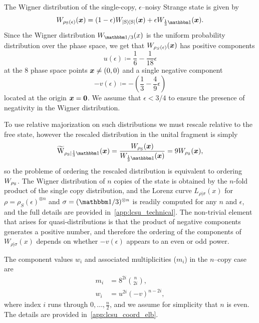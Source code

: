 \documentclass[pra,
aps,
twocolumn,
superscriptaddress,
groupedaddress,
nofootinbib,
reprint
]{revtex4-1}
\begin{document}
The Wigner distribution of the single-copy, $\epsilon$--noisy Strange state  is given by
\begin{equation}
	\W[\bmx]{\rho_{\rm{S}}(\epsilon)} = (1-\epsilon)\W[\bmx]{\ketbra{\rm{S}}} + \epsilon\W[\bmx]{\frac{1}{3}\id}.
\end{equation}
Since the Wigner distribution $W_{\I/3}(x)$ is the uniform probability distribution over the phase space, we get that $W_{\rho_S(\epsilon) } (\boldsymbol{x})$ has positive components
\begin{equation}
	u(\epsilon) \coloneqq \frac{1}{6} -\frac{1}{18}\epsilon
\end{equation}
at the 8 phase space points $\boldsymbol{x}  \ne (0,0)$ and a single negative component
\begin{equation}
	- v(\epsilon) \coloneqq - \left( \frac{1}{3} -\frac{4}{9}\epsilon \right)
\end{equation}
located at the origin $\bm{x} = \bm{0}$. We assume that $\epsilon < 3/4$ to ensure the presence of negativity in the Wigner distribution. 

To use relative majorization on such distributions we must rescale relative to the free state, however the rescaled distribution in the unital fragment is simply
\begin{equation}
	\widetilde{\rm{W}}_{\rho_{\rm{S}}|\frac{1}{3}\id}(\bmx) = \frac{\W[\bmx]{\rho_{\rm{S}}}}{\W[\bmx]{\frac{1}{3}\id}} = 9\W[\bmx]{\rho_{\rm{S}}},
\end{equation}
so the probleme of ordering the rescaled distribution is equivalent to ordering $\W{\rho_{\rm{S}}}$. The Wigner distribution of $n$ copies of the state is obtained by the $n$-fold product of the single copy distribution, and the Lorenz curve $L_{\rho|\sigma}(x)$ for $\rho = \rho_S(\epsilon)^{\otimes n}$ and $\sigma = (\I/3)^{\otimes n}$ is readily computed for any $n$ and $\epsilon$, and the full details are provided in~\cref{app:lcsu_technical}. The non-trivial element that arises for quasi-distributions is that the product of negative components generates a positive number, and therefore the ordering of the components of $W_{\rho |\sigma}(x)$ depends on whether $-v(\epsilon)$ appears to an even or odd power.

The component values $w_i$ and associated multiplicities ($m_i$) in the $n$--copy case are 
\begin{align}
	m_i &= 8^{2i}\binom{n}{2i}, \\
	w_i &= u^{2i}(-v)^{n-2i},
\end{align}
where index $i$ runs through $0,\dots,\frac{n}{2}$, and we assume for simplicity that $n$ is even. The details are provided in~\cref{app:lcsu_coord_elb}. 
\end{document}
